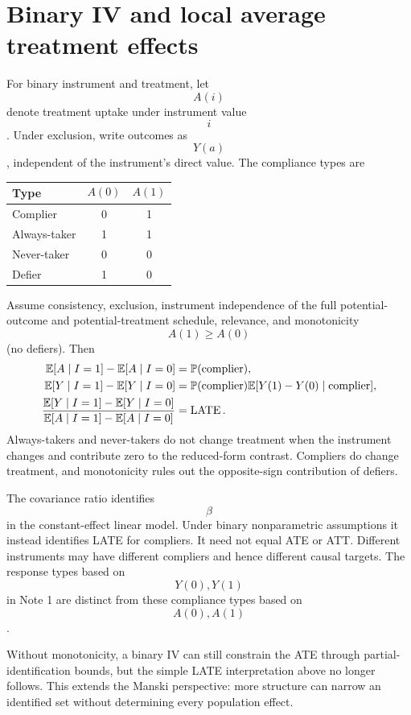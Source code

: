 \section{Binary IV and local average treatment effects}
For binary instrument and treatment, let $$A(i)$$ denote treatment uptake under instrument value $$i$$. Under exclusion, write outcomes as $$Y(a)$$, independent of the instrument's direct value. The compliance types are
\begin{center}
\begin{tabular}{lcc}\toprule
Type & $$A(0)$$ & $$A(1)$$\\\midrule
Complier &0&1\\
Always-taker &1&1\\
Never-taker &0&0\\
Defier &1&0\\\bottomrule
\end{tabular}
\end{center}
Assume consistency, exclusion, instrument independence of the full potential-outcome and potential-treatment schedule, relevance, and monotonicity $$A(1)\geq A(0)$$ (no defiers). Then
\begin{align}
\mathbb E[A\mid I=1]-\mathbb E[A\mid I=0]&=\mathbb P(\text{complier}),\\
\mathbb E[Y\mid I=1]-\mathbb E[Y\mid I=0]
&=\mathbb P(\text{complier})\mathbb E[Y(1)-Y(0)\mid\text{complier}],\\
\frac{\mathbb E[Y\mid I=1]-\mathbb E[Y\mid I=0]}
{\mathbb E[A\mid I=1]-\mathbb E[A\mid I=0]}
&=\operatorname{LATE}.
\end{align}
Always-takers and never-takers do not change treatment when the instrument changes and contribute zero to the reduced-form contrast. Compliers do change treatment, and monotonicity rules out the opposite-sign contribution of defiers.
\begin{correction}
The covariance ratio identifies $$\beta$$ in the constant-effect linear model. Under binary nonparametric assumptions it instead identifies LATE for compliers. It need not equal ATE or ATT. Different instruments may have different compliers and hence different causal targets. The response types based on $$Y(0),Y(1)$$ in Note 1 are distinct from these compliance types based on $$A(0),A(1)$$.
\end{correction}
Without monotonicity, a binary IV can still constrain the ATE through partial-identification bounds, but the simple LATE interpretation above no longer follows. This extends the Manski perspective: more structure can narrow an identified set without determining every population effect.

